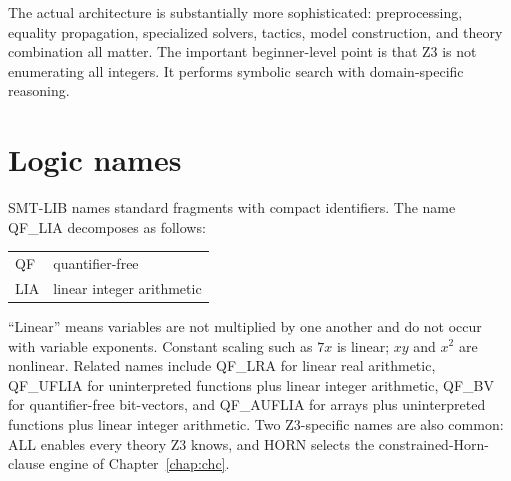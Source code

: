 \documentclass[10pt,letterpaper,oneside]{report}
\newcommand{\QFLIA}{\textsf{QF\_LIA}}
\newcommand{\QFBV}{\textsf{QF\_BV}}
\begin{document}
The actual architecture is substantially more sophisticated: preprocessing, equality propagation, specialized solvers, tactics, model construction, and theory combination all matter. The important beginner-level point is that Z3 is not enumerating all integers. It performs symbolic search with domain-specific reasoning.

\section{Logic names}

SMT-LIB names standard fragments with compact identifiers. The name \QFLIA{} decomposes as follows:

\begin{center}
\begin{tabular}{@{}ll@{}}
\toprule
\textsf{QF} & quantifier-free \\
\textsf{LIA} & linear integer arithmetic \\
\bottomrule
\end{tabular}
\end{center}

``Linear'' means variables are not multiplied by one another and do not occur with variable exponents. Constant scaling such as $7x$ is linear; $xy$ and $x^2$ are nonlinear. Related names include \textsf{QF\_LRA} for linear real arithmetic, \textsf{QF\_UFLIA} for uninterpreted functions plus linear integer arithmetic, \QFBV{} for quantifier-free bit-vectors, and \textsf{QF\_AUFLIA} for arrays plus uninterpreted functions plus linear integer arithmetic. Two Z3-specific names are also common: \textsf{ALL} enables every theory Z3 knows, and \textsf{HORN} selects the constrained-Horn-clause engine of Chapter~\ref{chap:chc}.
\end{document}

